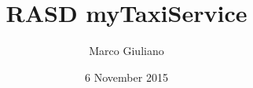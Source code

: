 \documentclass[12pt,a4paper]{book}
\begin{document}
	\title{RASD myTaxiService}
	\author{Marco Giuliano}
	\date{6 November 2015}
	\maketitle
	\tableofcontents
	
	
\end{document}

